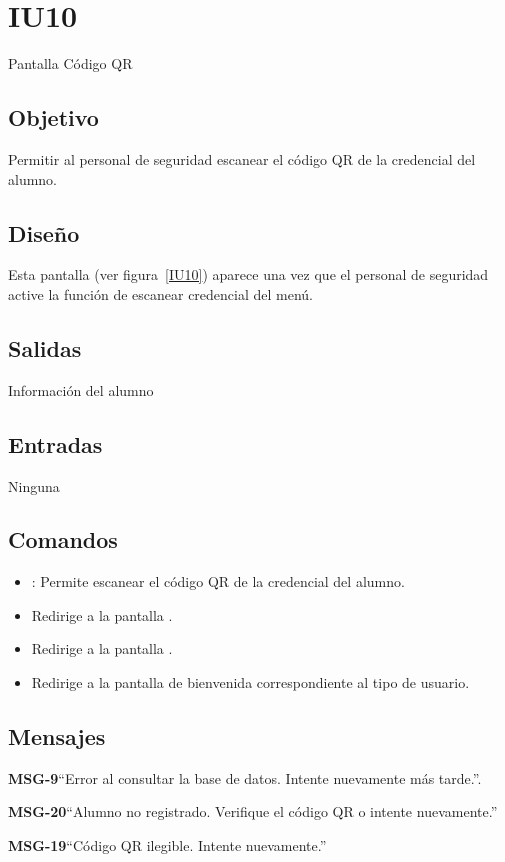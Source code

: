 \section{IU10}{Pantalla Código QR}

\subsection{Objetivo}
Permitir al personal de seguridad escanear el código QR de la credencial del alumno.

\subsection{Diseño}
Esta pantalla  (ver figura~\ref{IU10}) aparece una vez que el personal de seguridad active la función de escanear credencial del menú. 


\subsection{Salidas}
Información del alumno

\subsection{Entradas}
Ninguna

\subsection{Comandos}
\begin{itemize}
	\item {}: Permite escanear el código QR de la credencial del alumno.
	\item {} Redirige a la pantalla .
    \item {} Redirige a la pantalla .
    \item {} Redirige a la pantalla de bienvenida correspondiente al tipo de usuario.
\end{itemize}

\subsection{Mensajes}

\begin{Citemize}
	\item {\bf MSG-9}{``Error al consultar la base de datos. Intente nuevamente más tarde.''}.
	\item {\bf MSG-20}{``Alumno no registrado. Verifique el código QR o intente nuevamente.''}
	\item {\bf MSG-19}{``Código QR ilegible. Intente nuevamente.''}
\end{Citemize}

